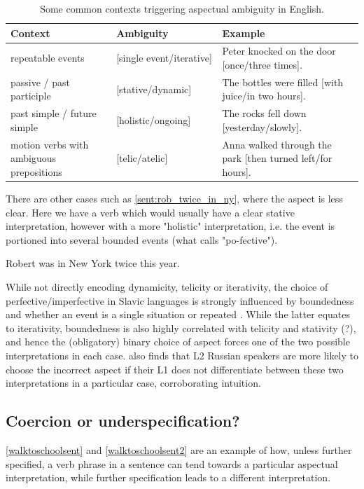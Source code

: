 \begin{table}[h]
    \centering
    \begin{tabular}{|m{0.3\linewidth} |m{0.3\linewidth}| m{0.4\linewidth}|} \hline
        Context & Ambiguity & Example  \\ \hline \hline
        repeatable events & [single event/iterative] & Peter knocked on the door [once/three times].  \\ \hline
        passive / past participle &  [stative/dynamic] & The bottles were filled [with juice/in two hours]. \\ \hline
        past simple / future simple & [holistic/ongoing] & The rocks fell down [yesterday/slowly]. \\ \hline
        motion verbs with ambiguous prepositions & [telic/atelic] & Anna walked through the park [then turned left/for hours]. \\ \hline
    \end{tabular}
    \caption{Some common contexts triggering aspectual ambiguity in English.}
\end{table}
\label{table:asp_amb_contexts_eng}

There are other cases such as \ref{sent:rob_twice_in_ny}, where the aspect is less clear. Here we have a verb which would usually have a clear stative interpretation, however with a more "holistic" interpretation, i.e. the event is portioned into several bounded events (what \citet{10.1093/jos/8.4.363} calls "po-fective").

\begin{exe}
    \ex Robert was in New York twice this year.
    \label{sent:rob_twice_in_ny}
\end{exe}


While not directly encoding dynamicity, telicity or iterativity, the choice of perfective/imperfective in Slavic languages is strongly influenced by boundedness and whether an event is a single situation or repeated \citep{wiemer2017}. While the latter equates to iterativity, boundedness is also highly correlated with telicity and stativity (?), and hence the (obligatory) binary choice of aspect forces one of the two possible interpretations in each case. \citet{errors_in_russian_aspect_apresyan} also finds that L2 Russian speakers are more likely to choose the incorrect aspect if their L1 does not differentiate between these two interpretations in a particular case, corroborating intuition.

\subsection{Coercion or underspecification?}
\label{sect:coerc_or_under}
\ref{walktoschoolsent} and \ref{walktoschoolsent2} are an example of how, unless further specified, a verb phrase in a sentence can tend towards a particular aspectual interpretation, while further specification leads to a different interpretation. 

